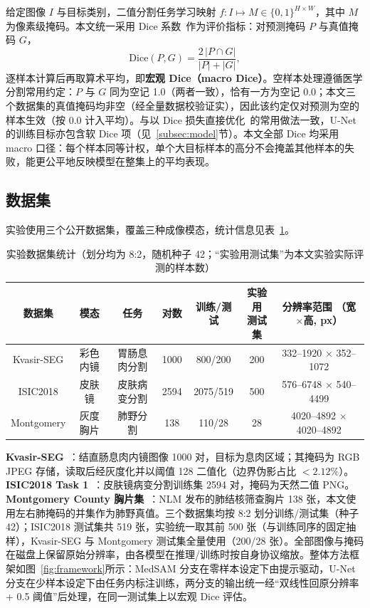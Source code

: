 \documentclass[zihao=-4,a4paper]{ctexart}
\begin{document}
给定图像 $I$ 与目标类别，二值分割任务学习映射 $f: I \mapsto M \in \{0,1\}^{H\times W}$，其中 $M$ 为像素级掩码。本文统一采用 Dice 系数~\cite{dice1945measures}作为评价指标：对预测掩码 $P$ 与真值掩码 $G$，
\begin{equation}
  \mathrm{Dice}(P,G) = \frac{2\,|P \cap G|}{|P| + |G|},
  \label{eq:dice}
\end{equation}
逐样本计算后再取算术平均，即\textbf{宏观 Dice（macro Dice）}。空样本处理遵循医学分割常用约定：$P$ 与 $G$ 同为空记 1.0（两者一致），恰有一方为空记 0.0；本文三个数据集的真值掩码均非空（经全量数据校验证实），因此该约定仅对预测为空的样本生效（按 0.0 计入平均）。与以 Dice 损失直接优化~\cite{milletari2016vnet,sudre2017generalised}的常用做法一致，U-Net 的训练目标亦包含软 Dice 项（见~\ref{subsec:model}节）。本文全部 Dice 均采用 macro 口径：每个样本同等计权，单个大目标样本的高分不会掩盖其他样本的失败，能更公平地反映模型在整集上的平均表现。

\subsection{数据集}

实验使用三个公开数据集，覆盖三种成像模态，统计信息见表~\ref{tab:stats}。

\begin{table}[htbp]
\centering
\caption{实验数据集统计（划分均为 8:2，随机种子 42；``实验用测试集''为本文实验实际评测的样本数）}
\label{tab:stats}
\footnotesize
\setlength{\tabcolsep}{3.5pt}
\begin{tabular}{ccccccc}
\toprule
数据集 & 模态 & 任务 & 对数 & 训练/测试 & \makecell{实验用\\测试集} & \makecell{分辨率范围\\（宽$\times$高, px）} \\
\midrule
Kvasir-SEG & 彩色内镜 & 胃肠息肉分割 & 1000 & 800/200 & 200 & 332--1920 $\times$ 352--1072 \\
ISIC2018   & 皮肤镜   & 皮肤病变分割 & 2594 & 2075/519 & 500 & 576--6748 $\times$ 540--4499 \\
Montgomery & 灰度胸片 & 肺野分割     & 138  & 110/28   & 28  & 4020--4892 $\times$ 4020--4892 \\
\bottomrule
\end{tabular}
\end{table}

\textbf{Kvasir-SEG}~\cite{jha2020kvasir}：结直肠息肉内镜图像 1000 对，目标为息肉区域；其掩码为 RGB JPEG 存储，读取后经灰度化并以阈值 128 二值化（边界伪影占比 $<2.12\%$）。\textbf{ISIC2018 Task 1}~\cite{codella2019skin}：皮肤镜病变分割训练集 2594 对，掩码为天然二值 PNG。\textbf{Montgomery County 胸片集}~\cite{jaeger2014two}：NLM 发布的肺结核筛查胸片 138 张，本文使用左右肺掩码的并集作为肺野真值。三个数据集均按 8:2 划分训练/测试集（种子 42）；ISIC2018 测试集共 519 张，实验统一取其前 500 张（与训练同序的固定抽样），Kvasir-SEG 与 Montgomery 测试集全量使用（200/28 张）。全部图像与掩码在磁盘上保留原始分辨率，由各模型在推理/训练时按自身协议缩放。整体方法框架如图~\ref{fig:framework}所示：MedSAM 分支在零样本设定下由提示驱动，U-Net 分支在少样本设定下由任务内标注训练，两分支的输出统一经``双线性回原分辨率 + 0.5 阈值''后处理，在同一测试集上以宏观 Dice 评估。
\end{document}
